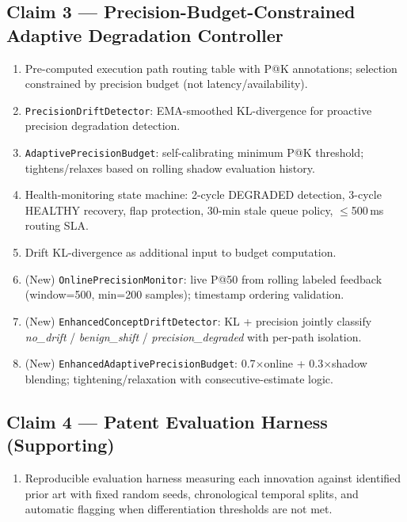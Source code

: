 \documentclass[12pt,a4paper]{article}
\begin{document}
\subsection{Claim 3 --- Precision-Budget-Constrained Adaptive Degradation Controller}
\begin{enumerate}[label=3.\arabic*,leftmargin=2.5em,noitemsep]
  \item Pre-computed execution path routing table with P@K annotations; selection
        constrained by precision budget (not latency/availability).
  \item \texttt{PrecisionDriftDetector}: EMA-smoothed KL-divergence for proactive
        precision degradation detection.
  \item \texttt{AdaptivePrecisionBudget}: self-calibrating minimum P@K threshold;
        tightens/relaxes based on rolling shadow evaluation history.
  \item Health-monitoring state machine: 2-cycle DEGRADED detection, 3-cycle HEALTHY
        recovery, flap protection, 30-min stale queue policy, $\leq$500\,ms routing SLA.
  \item Drift KL-divergence as additional input to budget computation.
  \item (New) \texttt{OnlinePrecisionMonitor}: live P@50 from rolling labeled feedback
        (window=500, min=200 samples); timestamp ordering validation.
  \item (New) \texttt{EnhancedConceptDriftDetector}: KL + precision jointly classify
        \textit{no\_drift} / \textit{benign\_shift} / \textit{precision\_degraded}
        with per-path isolation.
  \item (New) \texttt{EnhancedAdaptivePrecisionBudget}: 0.7$\times$online +
        0.3$\times$shadow blending; tightening/relaxation with consecutive-estimate logic.
\end{enumerate}

\subsection{Claim 4 --- Patent Evaluation Harness (Supporting)}
\begin{enumerate}[label=4.\arabic*,leftmargin=2.5em,noitemsep]
  \item Reproducible evaluation harness measuring each innovation against identified prior
        art with fixed random seeds, chronological temporal splits, and automatic flagging
        when differentiation thresholds are not met.
\end{enumerate}
\end{document}
